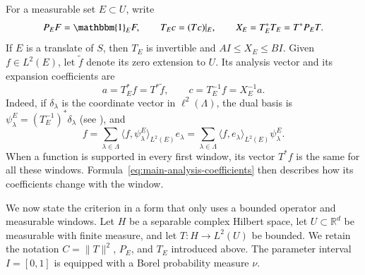\documentclass[10pt,a4paper]{amsart}
\def\R{\mathbb{R}}
\newcommand\norm[1]{\|#1\|}
\newcommand\Inpro[3]{\langle #1,#2\rangle_{#3}}
\newcommand\1{\mathbbm{1}}
\begin{document}
For a measurable set $E\subset U$, write
\begin{equation*}
    P_EF=\1_EF,\qquad T_Ec=(Tc)|_E,
    \qquad X_E=T_E^*T_E=T^*P_ET.
\end{equation*}
If $E$ is a translate of $S$, then $T_E$ is invertible and
$AI\le X_E\le BI$. Given $f\in L^2(E)$, let $\widetilde f$ denote its zero
extension to $U$. Its analysis vector and its expansion coefficients are
\begin{equation}\label{eq:main-analysis-coefficients}
    a=T_E^*f=T^*\widetilde f,
    \qquad c=T_E^{-1}f=X_E^{-1}a.
\end{equation}
Indeed, if $\delta_\lambda$ is the coordinate vector in $\ell^2(\Lambda)$,
the dual basis is $\psi_\lambda^E=(T_E^{-1})^*\delta_\lambda$
(see \cite{OU16}), and
\begin{equation*}
    f=\sum_{\lambda\in\Lambda}\Inpro{f}{\psi_\lambda^E}{L^2(E)}e_\lambda
     =\sum_{\lambda\in\Lambda}\Inpro{f}{e_\lambda}{L^2(E)}\psi_\lambda^E.
\end{equation*}
When a function is supported in every first window, its vector $T^*f$ is the
same for all these windows. Formula~\eqref{eq:main-analysis-coefficients}
then describes how its coefficients change with the window.

We now state the criterion in a form that only uses a bounded operator and
measurable windows. Let $H$ be a separable complex Hilbert space, let
$U\subset\R^d$ be measurable with finite measure, and let
$T:H\to L^2(U)$ be bounded. We retain the notation $C=\norm{T}^2$,
$P_E$, and $T_E$ introduced above. The parameter interval $I=[0,1]$ is
equipped with a Borel probability measure $\nu$.
\end{document}

